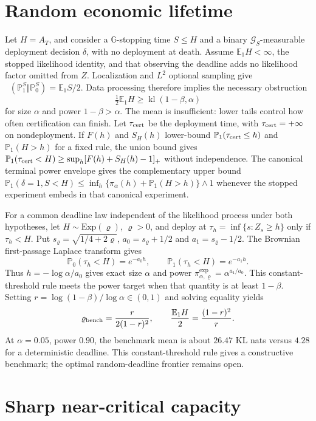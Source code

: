 \documentclass[11pt]{article}
\numberwithin{equation}{section}
\theoremstyle{plain}
\theoremstyle{definition}
\theoremstyle{remark}
\DeclareMathOperator{\KL}{D_{\mathrm{KL}}}
\newcommand{\Pzero}{\mathbb P_0}
\newcommand{\Pone}{\mathbb P_1}
\newcommand{\Eone}{\mathbb E_1}
\newcommand{\Ginfo}{\mathbb G}
\begin{document}
\section{Random economic lifetime}\label{random-economic-death}

Let $H=A_T$, and consider a $\Ginfo$-stopping time $S\le H$ and a binary $\mathcal G_S$-measurable deployment decision $\delta$, with no deployment at death. Assume $\Eone H<\infty$, the stopped likelihood identity, and that observing the deadline adds no likelihood factor omitted from $Z$. Localization and $L^2$ optional sampling give $\KL(\Pone^S\Vert\Pzero^S)=\Eone S/2$. Data processing therefore implies the necessary obstruction
\[
\tfrac12\Eone H\ge\operatorname{kl}(1-\beta,\alpha)
\]
for size $\alpha$ and power $1-\beta>\alpha$. The mean is insufficient: lower tails control how often certification can finish. Let $\tau_{\rm cert}$ be the deployment time, with $\tau_{\rm cert}=+\infty$ on nondeployment. If $F(h)$ and $S_H(h)$ lower-bound $\Pone(\tau_{\rm cert}\le h)$ and $\Pone(H>h)$ for a fixed rule, the union bound gives $\Pone(\tau_{\rm cert}<H)\ge\sup_h[F(h)+S_H(h)-1]_+$ without independence. The canonical terminal power envelope gives the complementary upper bound $\Pone(\delta=1,S<H)\le\inf_h\{\pi_\alpha(h)+\Pone(H>h)\}\wedge1$ whenever the stopped experiment embeds in that canonical experiment.

For a common deadline law independent of the likelihood process under both hypotheses, let $H\sim\mathrm{Exp}(\varrho)$, $\varrho>0$, and deploy at $\tau_h=\inf\{s:Z_s\ge h\}$ only if $\tau_h<H$. Put $s_\varrho=\sqrt{1/4+2\varrho}$, $a_0=s_\varrho+1/2$ and $a_1=s_\varrho-1/2$. The Brownian first-passage Laplace transform gives
\[
\Pzero(\tau_h<H)=e^{-a_0h},\qquad
\Pone(\tau_h<H)=e^{-a_1h}.
\]
Thus $h=-\log\alpha/a_0$ gives exact size $\alpha$ and power $\pi^{\exp}_{\alpha,\varrho}=\alpha^{a_1/a_0}$. This constant-threshold rule meets the power target when that quantity is at least $1-\beta$. Setting $r=\log(1-\beta)/\log\alpha\in(0,1)$ and solving equality yields
\[
\varrho_{\rm bench}=\frac{r}{2(1-r)^2},\qquad
\frac{\Eone H}{2}=\frac{(1-r)^2}{r}.
\]
At $\alpha=0.05$, power $0.90$, the benchmark mean is about $26.47$ KL nats versus $4.28$ for a deterministic deadline. This constant-threshold rule gives a constructive benchmark; the optimal random-deadline frontier remains open.

\section{Sharp near-critical capacity}\label{app:sharp-capacity-proof}
\end{document}
